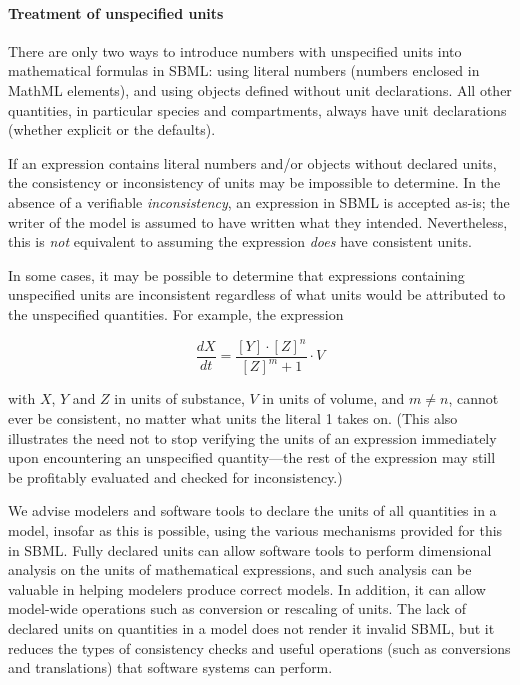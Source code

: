 \paragraph{Treatment of unspecified units}

There are only two ways to introduce numbers with unspecified
units into mathematical formulas in SBML: using literal numbers
(\ie numbers enclosed in MathML  elements), and using
\Parameter objects defined without unit declarations.  All other
quantities, in particular species and compartments, always have
unit declarations (whether explicit or the defaults).

If an expression contains literal numbers and/or \Parameter
objects without declared units, the consistency or inconsistency
of units may be impossible to determine.  In the absence of a
verifiable \emph{inconsistency}, an expression in SBML is accepted
as-is; the writer of the model is assumed to have written what
they intended.  Nevertheless, this is \emph{not} equivalent to
assuming the expression \emph{does} have consistent units.

In some cases, it may be possible to determine that expressions
containing unspecified units are inconsistent regardless of what
units would be attributed to the unspecified quantities.  For
example, the expression
\begin{linenomath}
  \begin{equation*}
    \frac{dX}{dt} = \frac{[Y] \cdot [Z]^n}{[Z]^m + 1} \cdot V
  \end{equation*}
\end{linenomath}
with $X$, $Y$ and $Z$ in units of substance, $V$ in
units of volume, and $m \neq n$, cannot ever be consistent, no
matter what units the literal 1 takes on.  (This also illustrates
the need not to stop verifying the units of an expression
immediately upon encountering an unspecified quantity---the rest
of the expression may still be profitably evaluated and checked
for inconsistency.)

We advise modelers and software tools to declare the units of all
quantities in a model, insofar as this is possible, using the
various mechanisms provided for this in SBML.  Fully declared
units can allow software tools to perform dimensional analysis on
the units of mathematical expressions, and such analysis can be
valuable in helping modelers produce correct models.  In addition,
it can allow model-wide operations such as conversion or rescaling
of units.  The lack of declared units on quantities in a model
does not render it invalid SBML, but it reduces the types of
consistency checks and useful operations (such as conversions and
translations) that software systems can perform.


